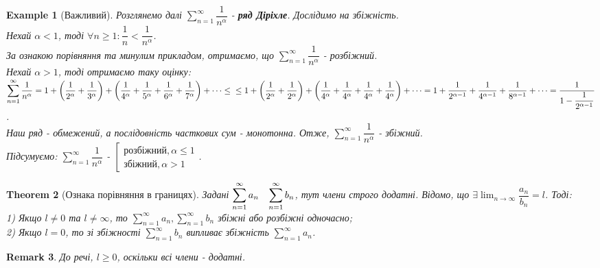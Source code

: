 \documentclass[a4paper, 10pt]{article}
\def\huge{\displaystyle}
\theoremstyle{theoremdd}
\newtheorem{theorem}{Theorem}[subsection]
\theoremstyle{theoremdd}
\theoremstyle{theoremdd}
\theoremstyle{theoremdd}
\theoremstyle{theoremdd}
\newtheorem{example}[theorem]{Example}
\theoremstyle{theoremdd}
\theoremstyle{theoremdd}
\newtheorem{remark}[theorem]{Remark}
\theoremstyle{theoremdd}
\theoremstyle{theoremdd}
\begin{document}
\begin{example}[Важливий]
Розглянемо далі $\huge \sum_{n=1}^{\infty} \dfrac{1}{n^\alpha}$ - \textbf{ряд Діріхле}. Дослідимо на збіжність.\\
Нехай $\alpha < 1$, тоді $\forall n \geq 1: \dfrac{1}{n} < \dfrac{1}{n^{\alpha}}$.\\
За ознакою порівняння та минулим прикладом, отримаємо, що $\huge \sum_{n=1}^{\infty} \dfrac{1}{n^\alpha}$ - розбіжний.\\
Нехай $\alpha > 1$, тоді отримаємо таку оцінку:\\
$\displaystyle\sum_{n=1}^\infty \dfrac{1}{n^\alpha} = 1 + \left( \dfrac{1}{2^\alpha} + \dfrac{1}{3^\alpha} \right) + \left( \dfrac{1}{4^\alpha} + \dfrac{1}{5^\alpha} + \dfrac{1}{6^\alpha} + \dfrac{1}{7^\alpha}  \right) + \dots \leq \\
\leq 1 + \left( \dfrac{1}{2^\alpha} + \dfrac{1}{2^\alpha} \right) + \left( \dfrac{1}{4^\alpha} + \dfrac{1}{4^\alpha} + \dfrac{1}{4^\alpha} + \dfrac{1}{4^\alpha}  \right) + \dots = 1 + \dfrac{1}{2^{\alpha-1}} + \dfrac{1}{4^{\alpha-1}} + \dfrac{1}{8^{\alpha-1}} + \dots = \dfrac{1}{1-\dfrac{1}{2^{\alpha-1}}}$.\\
Наш ряд - обмежений, а послідовність часткових сум - монотонна. Отже, $\huge \sum_{n=1}^\infty \dfrac{1}{n^{\alpha}}$ - збіжний.\\
Підсумуємо: $\huge \sum_{n=1}^{\infty} \dfrac{1}{n^{\alpha}}$ - $\left[ \begin{gathered} \textrm{розбіжний}, \alpha \leq 1 \\ \textrm{збіжний}, \alpha > 1   \end{gathered} \right.$.
\end{example}

\begin{theorem}[Ознака порівняння в границях]
Задані $\huge \sum_{n=1}^{\infty} a_n \hspace{0.3cm} \sum_{n=1}^{\infty} b_n$, тут члени строго додатні. Відомо, що $\exists \huge \lim_{n \to \infty} \dfrac{a_n}{b_n} = l$. Тоді:\\
1) Якщо $l \neq 0$ та $l \neq \infty$, то $\huge \sum_{n=1}^{\infty} a_n, \sum_{n=1}^{\infty} b_n$ збіжні або розбіжні одночасно;\\
2) Якщо $l = 0$, то зі збіжності $\huge \sum_{n=1}^{\infty} b_n$ випливає збіжність $\huge \sum_{n=1}^{\infty} a_n$.
\end{theorem}

\begin{remark}
До речі, $l \geq 0$, оскільки всі члени - додатні.
\end{remark}
\end{document}
